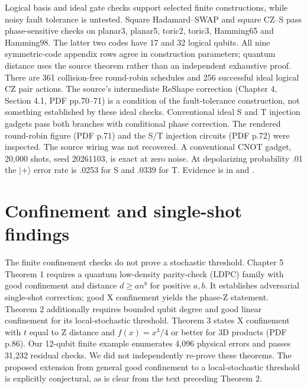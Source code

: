 Logical basis and ideal gate checks support selected finite constructions, while noisy fault tolerance is untested. Square Hadamard--SWAP and square CZ--S pass phase-sensitive checks on planar3, planar5, toric2, toric3, Hamming65 and Hamming98. The latter two codes have 17 and 32 logical qubits. All nine symmetric-code appendix rows agree in construction parameters; quantum distance uses the source theorem rather than an independent exhaustive proof. There are 361 collision-free round-robin schedules and 256 successful ideal logical CZ pair actions. The source's intermediate ReShape correction (Chapter 4, Section 4.1, PDF pp.70--71) is a condition of the fault-tolerance construction, not something established by these ideal checks. Conventional ideal S and T injection gadgets pass both branches with conditional phase correction. The rendered round-robin figure (PDF p.71) and the S/T injection circuits (PDF p.72) were inspected. The source wiring was not recovered. A conventional CNOT gadget, 20,000 shots, seed 20261103, is exact at zero noise. At depolarizing probability .01 the $|+\rangle$ error rate is .0253 for S and .0339 for T. Evidence is in \href{https://github.com/alectionary/vibe-math/blob/master/formalization/quintavalle-hgp/results/exact_checks.json}{} and \href{https://github.com/alectionary/vibe-math/blob/master/formalization/quintavalle-hgp/results/independent_checks.json}{}.

\section{Confinement and single-shot findings}
The finite confinement checks do not prove a stochastic threshold. Chapter 5 Theorem 1 requires a quantum low-density parity-check (LDPC) family with good confinement and distance $d\geq an^b$ for positive $a,b$. It establishes adversarial single-shot correction; good X confinement yields the phase-Z statement. Theorem 2 additionally requires bounded qubit degree and good linear confinement for its local-stochastic threshold. Theorem 3 states X confinement with $t$ equal to Z distance and $f(x)=x^3/4$ or better for 3D products (PDF p.86). Our 12-qubit finite example enumerates 4,096 physical errors and passes 31,232 residual checks. We did not independently re-prove these theorems. The proposed extension from general good confinement to a local-stochastic threshold is explicitly conjectural, as is clear from the text preceding Theorem 2.

